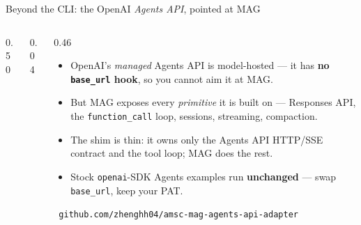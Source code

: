 \begin{frame}{Beyond the CLI: the OpenAI \emph{Agents API}, pointed at MAG}
\begin{columns}[T,totalwidth=\textwidth]
\begin{column}{0.50\textwidth}
    \end{column}
    \begin{column}{0.04\textwidth}\end{column}
    \begin{column}{0.46\textwidth}
      \scriptsize
      \begin{itemize}\setlength\itemsep{2.5pt}
        \item[\faBan] OpenAI's \emph{managed} Agents API is model-hosted --- it has
          \textbf{no \texttt{base\_url} hook}, so you cannot aim it at MAG.
        \item[\faPlug] But MAG exposes every \emph{primitive} it is built on ---
          Responses API, the \texttt{function\_call} loop, sessions, streaming,
          compaction.
        \item[\faLayerGroup] The shim is thin: it owns only the Agents API
          HTTP/SSE contract and the tool loop; MAG does the rest.
        \item[\faCheckCircle] Stock \texttt{openai}-SDK Agents examples run
          \textbf{unchanged} --- swap \texttt{base\_url}, keep your PAT.
      \end{itemize}
      \vspace{3pt}
      {\tiny\color{midgray}\faGithub\ \texttt{github.com/zhenghh04/amsc-mag-agents-api-adapter}}
    \end{column}
  \end{columns}
\end{frame}

